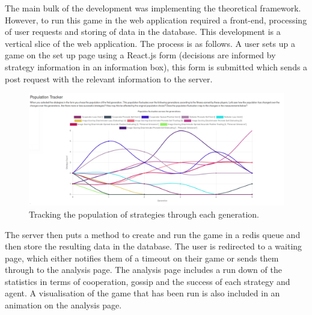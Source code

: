 \documentclass[]{final_report}
\begin{document}
The main bulk of the development was implementing the theoretical framework. However, to run this game in the web application required a front-end, processing of user requests and storing of data in the database. This development is a vertical slice of the web application. The process is as follows. A user sets up a game on the set up page using a React.js form (decisions are informed by strategy information in an information box), this form is submitted which sends a post request with the relevant information to the server.\par 
\begin{figure}
\vspace{-30pt}
\begin{framed}
	\begin{center}
	\includegraphics[width=\textwidth]{PopulationTracker.png}
	\caption{Tracking the population of strategies through each generation.}
	\label{fig:population_tracker}
	\end{center}
\end{framed}
\vspace{-30pt}
\end{figure}
The server then puts a method to create and run the game in a redis queue and then store the resulting data in the database. The user is redirected to a waiting page, which either notifies them of a timeout on their game or sends them through to the analysis page. The analysis page includes a run down of the statistics in terms of cooperation, gossip and the success of each strategy and agent. A visualisation of the game that has been run is also included in an animation on the analysis page.\par 
\end{document}
